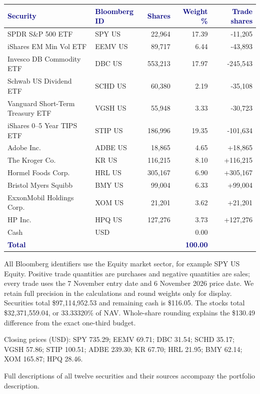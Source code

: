 \documentclass[10pt,a4paper]{article}
\newcommand{\hd}[1]{\textcolor{navy}{\textbf{#1}}}
\begin{document}
\begin{center}\footnotesize\setlength{\tabcolsep}{4pt}
\begin{tabularx}{\linewidth}{@{}X l r r r@{}}\toprule
\hd{Security}&\hd{Bloomberg ID}&\hd{Shares}&\hd{Weight \%}&\hd{Trade shares}\\\midrule
SPDR S\&P 500 ETF & SPY US & 22,964 & 17.39 & -11,205 \\
iShares EM Min Vol ETF & EEMV US & 89,717 & 6.44 & -43,893 \\
Invesco DB Commodity ETF & DBC US & 553,213 & 17.97 & -245,543 \\
Schwab US Dividend ETF & SCHD US & 60,380 & 2.19 & -35,108 \\
Vanguard Short-Term Treasury ETF & VGSH US & 55,948 & 3.33 & -30,723 \\
iShares 0--5 Year TIPS ETF & STIP US & 186,996 & 19.35 & -101,634 \\
Adobe Inc. & ADBE US & 18,865 & 4.65 & +18,865 \\
The Kroger Co. & KR US & 116,215 & 8.10 & +116,215 \\
Hormel Foods Corp. & HRL US & 305,167 & 6.90 & +305,167 \\
Bristol Myers Squibb & BMY US & 99,004 & 6.33 & +99,004 \\
ExxonMobil Holdings Corp. & XOM US & 21,201 & 3.62 & +21,201 \\
HP Inc. & HPQ US & 127,276 & 3.73 & +127,276 \\
\midrule Cash & USD & & 0.00 & \\
\hd{Total} & & & \hd{100.00} & \\\bottomrule
\end{tabularx}\end{center}
All Bloomberg identifiers use the Equity market sector, for example SPY US Equity. Positive trade quantities are purchases and negative quantities are sales; every trade uses the 7 November entry date and 6 November 2026 price date. We retain full precision in the calculations and round weights only for display. Securities total \$97,114,952.53 and remaining cash is \$116.05. The stocks total \$32,371,559.04, or 33.33320\% of NAV. Whole-share rounding explains the \$130.49 difference from the exact one-third budget.

Closing prices (USD): SPY 735.29; EEMV 69.71; DBC 31.54; SCHD 35.17; VGSH 57.86; STIP 100.51; ADBE 239.30; KR 67.70; HRL 21.95; BMY 62.14; XOM 165.87; HPQ 28.46.

Full descriptions of all twelve securities and their sources accompany the portfolio description.
\end{document}
